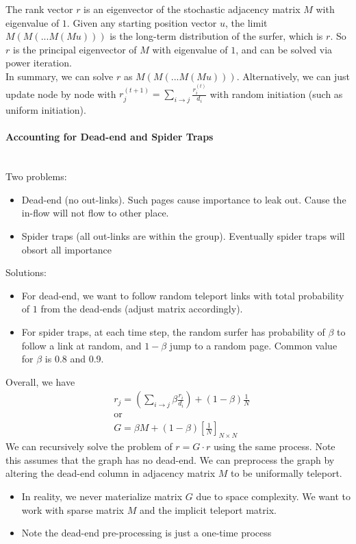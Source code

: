 The rank vector $r$ is an eigenvector of the stochastic adjacency matrix $M$ with eigenvalue of $1$. Given any starting position vector $u$,  the limit $M(M(...M(Mu)))$ is the long-term distribution of the surfer, which is $r$. So $r$ is the principal eigenvector of $M$ with eigenvalue of $1$, and can be solved via power iteration. \\

In summary, we can solve $r$ as $M(M(...M(Mu)))$. Alternatively, we can just update node by node with  $r_j^{(t+1)} = \sum_{i\rightarrow j}\frac{r_i^{(t)}}{d_i}$ with random initiation (such as uniform initiation).



\paragraph{Accounting for Dead-end and Spider Traps} \mbox{}\\
Two problems: 
    \begin{itemize}
        \item Dead-end (no out-links). Such pages cause importance to leak out. Cause the in-flow will not flow to other place. 
        \item Spider traps (all out-links are within the group). Eventually spider traps will obsort all importance
    \end{itemize}
Solutions: 
    \begin{itemize}
        \item For dead-end, we want to follow random teleport links with total probability of $1$ from the dead-ends (adjust matrix accordingly). 
        \item For spider traps, at each time step, the random surfer has probability of $\beta$ to follow a link at random, and $1 - \beta$ jump to a random page. Common value for $\beta$ is 0.8 and 0.9. 
    \end{itemize}
Overall, we have 
    \begin{align*}
        & r_j = (\sum_{i \rightarrow j} \beta \frac{r_i}{d_i}) + (1-\beta) \frac{1}{N} \\
        & \textrm{or}\\
        & G = \beta M + (1-\beta) [\frac{1}{N}]_{N\times N}
    \end{align*}
We can recursively solve the problem of $r = G \cdot r$ using the same process. Note this assumes that the graph has no dead-end. We can preprocess the graph by altering the dead-end column in adjacency matrix $M$ to be uniformally teleport. 
    \begin{itemize}
        \item In reality, we never materialize matrix $G$ due to space complexity. We want to work with sparse matrix $M$ and the implicit teleport matrix. 
        \item Note the dead-end pre-processing is just a one-time process
    \end{itemize}




